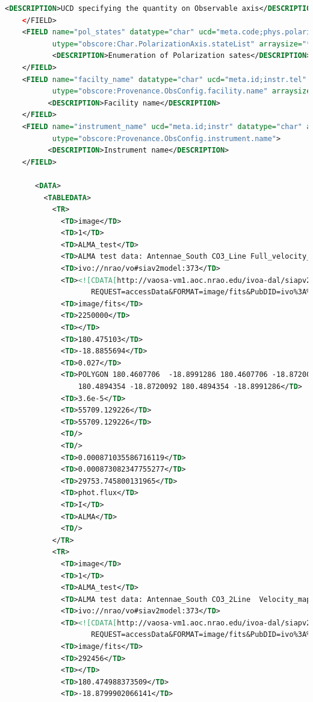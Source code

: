 \documentclass[11pt,a4paper]{ivoa}
\begin{document}
\begin{lstlisting}[basicstyle=\scriptsize,language=XML]
            <DESCRIPTION>UCD specifying the quantity on Observable axis</DESCRIPTION>
    </FIELD> 
    <FIELD name="pol_states" datatype="char" ucd="meta.code;phys.polarization"
           utype="obscore:Char.PolarizationAxis.stateList" arraysize="*" > 
           <DESCRIPTION>Enumeration of Polarization sates</DESCRIPTION>
    </FIELD> 
    <FIELD name="facilty_name" datatype="char" ucd="meta.id;instr.tel" 
           utype="obscore:Provenance.ObsConfig.facility.name" arraysize="*"> 
          <DESCRIPTION>Facility name</DESCRIPTION>
    </FIELD> 
    <FIELD name="instrument_name" ucd="meta.id;instr" datatype="char" arraysize="*"
           utype="obscore:Provenance.ObsConfig.instrument.name"> 
          <DESCRIPTION>Instrument name</DESCRIPTION>  
    </FIELD> 
      
       <DATA> 
         <TABLEDATA> 
           <TR> 
             <TD>image</TD> 
             <TD>1</TD> 
             <TD>ALMA_test</TD> 
             <TD>ALMA test data: Antennae_South CO3_Line Full_velocity_map</TD> 
             <TD>ivo://nrao/vo#siav2model:373</TD> 
             <TD><![CDATA[http://vaosa-vm1.aoc.nrao.edu/ivoa-dal/siapv2-vao/sync?
                    REQUEST=accessData&FORMAT=image/fits&PubDID=ivo%3A%2F%2Fnrao%2Fvo%23siav2model%3A373]]></TD> 
             <TD>image/fits</TD> 
             <TD>2250000</TD> 
             <TD></TD> 
             <TD>180.475103</TD> 
             <TD>-18.8855694</TD> 
             <TD>0.027</TD> 
             <TD>POLYGON 180.4607706  -18.8991286 180.4607706 -18.8720092  
                 180.4894354 -18.8720092 180.4894354 -18.8991286</TD> 
             <TD>3.6e-5</TD> 
             <TD>55709.129226</TD> 
             <TD>55709.129226</TD> 
             <TD/> 
             <TD/> 
             <TD>0.000871035586716119</TD> 
             <TD>0.000873082347755277</TD> 
             <TD>29753.745800131965</TD> 
             <TD>phot.flux</TD> 
             <TD>I</TD> 
             <TD>ALMA</TD> 
             <TD/> 
           </TR> 
           <TR>  
             <TD>image</TD> 
             <TD>1</TD> 
             <TD>ALMA_test</TD> 
             <TD>ALMA test data: Antennae_South CO3_2Line  Velocity_map_cutout</TD> 
             <TD>ivo://nrao/vo#siav2model:373</TD> 
             <TD><![CDATA[http://vaosa-vm1.aoc.nrao.edu/ivoa-dal/siapv2-vao/sync?
                    REQUEST=accessData&FORMAT=image/fits&PubDID=ivo%3A%2F%2Fnrao%2Fvo%23image-ZSKuYR]]></TD> 
             <TD>image/fits</TD> 
             <TD>292456</TD> 
             <TD></TD> 
             <TD>180.474988373509</TD> 
             <TD>-18.8799902066141</TD> 

\end{lstlisting}
\end{document}
